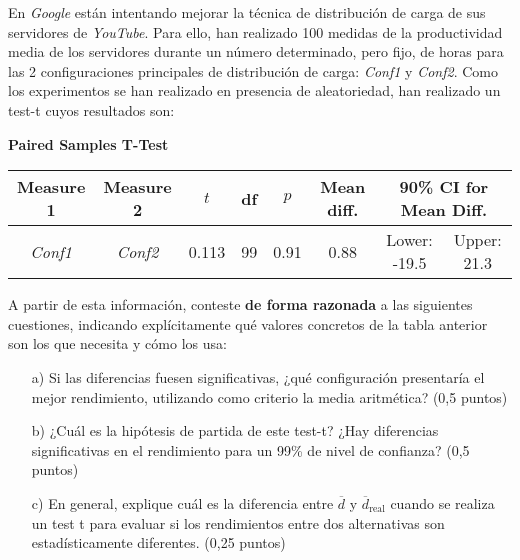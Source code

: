 \documentclass[a4paper,12pt]{article}
\begin{document}
\begin{tcolorbox}[colback=white!95!gray, colframe=black, title=4.- (1.25 puntos)]
    En \textit{Google} están intentando mejorar la técnica de distribución de carga de sus servidores de \textit{YouTube}. Para ello, han realizado 100 medidas de la productividad media de los servidores durante un número determinado, pero fijo, de horas para las 2 configuraciones principales de distribución de carga: \textit{Conf1} y \textit{Conf2}. Como los experimentos se han realizado en presencia de aleatoriedad, han realizado un test-t cuyos resultados son:
    
    \begin{center}
    \textbf{Paired Samples T-Test}
    \vspace{0.2em}
    
    \renewcommand{\arraystretch}{1.2}
    \begin{tabular}{|c|c|c|c|c|c|c|c|}
    \hline
    Measure 1 & Measure 2 & $t$ & df & $p$ & Mean diff. & \multicolumn{2}{c|}{90\% CI for Mean Diff.} \\
    \hline
    \textit{Conf1} & \textit{Conf2} & 0.113 & 99 & 0.91 & 0.88 & Lower: -19.5 & Upper: 21.3 \\
    \hline
    \end{tabular}
    \end{center}
    
    A partir de esta información, conteste \textbf{de forma razonada} a las siguientes cuestiones, indicando explícitamente qué valores concretos de la tabla anterior son los que necesita y cómo los usa:
    
    \begin{enumerate}
        \item[a)] Si las diferencias fuesen significativas, ¿qué configuración presentaría el mejor rendimiento, utilizando como criterio la media aritmética? (0,5 puntos)
        
        \item[b)] ¿Cuál es la hipótesis de partida de este test-t? ¿Hay diferencias significativas en el rendimiento para un 99\% de nivel de confianza? (0,5 puntos)
        
        \item[c)] En general, explique cuál es la diferencia entre $\overline{d}$ y $\overline{d}_{\text{real}}$ cuando se realiza un test t para evaluar si los rendimientos entre dos alternativas son estadísticamente diferentes. (0,25 puntos)
    \end{enumerate}
    \end{tcolorbox}
    
\end{document}
